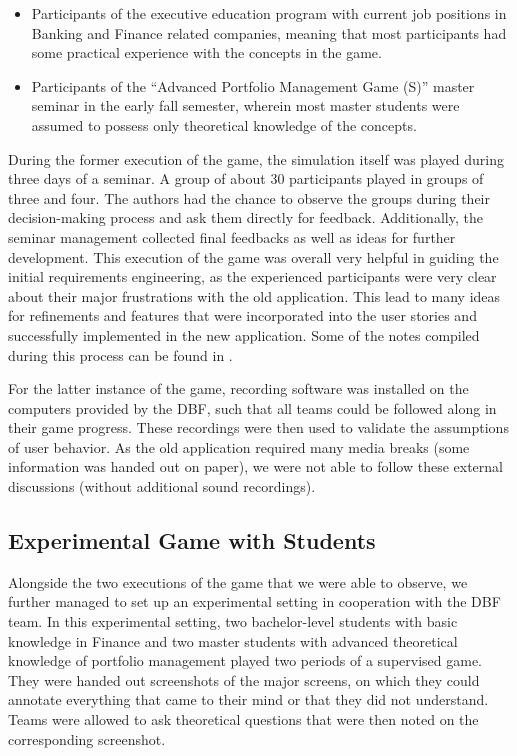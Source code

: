 \begin{itemize}
  \item Participants of the executive education program with current job positions in Banking and Finance related companies, meaning that most participants had some practical experience with the concepts in the game.
  \item Participants of the ``Advanced Portfolio Management Game (S)'' master seminar in the early fall semester, wherein most master students were assumed to possess only theoretical knowledge of the concepts.
\end{itemize}

During the former execution of the game, the simulation itself was played during three days of a seminar. A group of about 30 participants played in groups of three and four. The authors had the chance to observe the groups during their decision-making process and ask them directly for feedback. Additionally, the seminar management collected final feedbacks as well as ideas for further development.
This execution of the game was overall very helpful in guiding the initial requirements engineering, as the experienced participants were very clear about their major frustrations with the old application. This lead to many ideas for refinements and features that were incorporated into the user stories and successfully implemented in the new application. Some of the notes compiled during this process can be found in .

For the latter instance of the game, recording software was installed on the computers provided by the DBF, such that all teams could be followed along in their game progress. These recordings were then used to validate the assumptions of user behavior. As the old application required many media breaks (some information was handed out on paper), we were not able to follow these external discussions (without additional sound recordings).


\subsection{Experimental Game with Students}
Alongside the two executions of the game that we were able to observe, we further managed to set up an experimental setting in cooperation with the DBF team. In this experimental setting, two bachelor-level students with basic knowledge in Finance and two master students with advanced theoretical knowledge of portfolio management played two periods of a supervised game. They were handed out screenshots of the major screens, on which they could annotate everything that came to their mind or that they did not understand. Teams were allowed to ask theoretical questions that were then noted on the corresponding screenshot. \\

